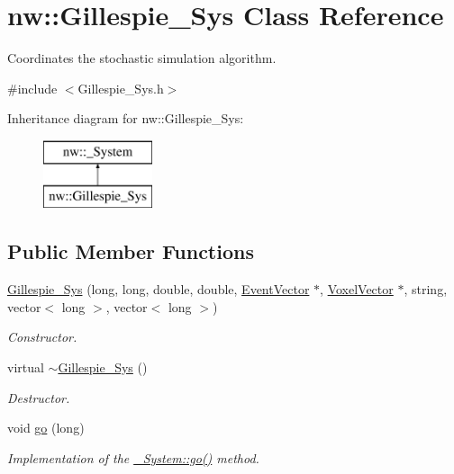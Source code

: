 \hypertarget{classnw_1_1_gillespie___sys}{\section{nw\+:\+:Gillespie\+\_\+\+Sys Class Reference}
\label{classnw_1_1_gillespie___sys}
}


Coordinates the stochastic simulation algorithm.  




{\ttfamily \#include $<$Gillespie\+\_\+\+Sys.\+h$>$}

Inheritance diagram for nw\+:\+:Gillespie\+\_\+\+Sys\+:\begin{figure}[H]
\begin{center}
\leavevmode
\includegraphics[height=2.000000cm]{df/d2f/classnw_1_1_gillespie___sys}
\end{center}
\end{figure}
\subsection*{Public Member Functions}
\begin{DoxyCompactItemize}
\item 
\hyperlink{classnw_1_1_gillespie___sys_aded1bb2d3c24e90b4da4e8f078b9f1b9}{Gillespie\+\_\+\+Sys} (long, long, double, double, \hyperlink{namespacenw_a0d9ea27d7802637354c7892806eac1fc}{Event\+Vector} $\ast$, \hyperlink{namespacenw_ad7146b8b5a9de9be416847f41135722c}{Voxel\+Vector} $\ast$, string, vector$<$ long $>$, vector$<$ long $>$)
\begin{DoxyCompactList}\small\item\em Constructor. \end{DoxyCompactList}\item 
virtual \hyperlink{classnw_1_1_gillespie___sys_ac1af358ef52d7a1c2e150f61e6005d6c}{$\sim$\+Gillespie\+\_\+\+Sys} ()
\begin{DoxyCompactList}\small\item\em Destructor. \end{DoxyCompactList}\item 
void \hyperlink{classnw_1_1_gillespie___sys_ad21aa35a51bac13fe64dc6d838e77aee}{go} (long)
\begin{DoxyCompactList}\small\item\em Implementation of the \hyperlink{classnw_1_1___system_ae0276aebba39a971d6e240a86a389713}{\+\_\+\+System\+::go()} method. \end{DoxyCompactList}\end{DoxyCompactItemize}
